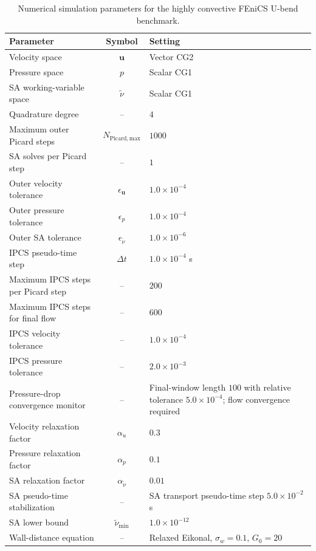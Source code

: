 \begin{table}[htbp]
	\centering
	\footnotesize
	\caption{Numerical simulation parameters for the highly convective FEniCS U-bend benchmark.}
	\label{tab:app_A_ubend_numerical}
	\renewcommand{\arraystretch}{1.2}
	\begin{tabularx}{\textwidth}{l c X}
		\hline
		\textbf{Parameter} & \textbf{Symbol} & \textbf{Setting} \\
		\hline
		Velocity space & $\mathbf{u}$ & Vector CG2 \\
		Pressure space & $p$ & Scalar CG1 \\
		SA working-variable space & $\tilde{\nu}$ & Scalar CG1 \\
		Quadrature degree & -- & $4$ \\
			Maximum outer Picard steps & $N_{\mathrm{Picard,max}}$ & $1000$ \\
		SA solves per Picard step & -- & $1$ \\
		Outer velocity tolerance & $\epsilon_{\mathbf{u}}$ & $1.0 \times 10^{-4}$ \\
		Outer pressure tolerance & $\epsilon_p$ & $1.0 \times 10^{-4}$ \\
		Outer SA tolerance & $\epsilon_{\tilde{\nu}}$ & $1.0 \times 10^{-6}$ \\
			IPCS pseudo-time step & $\Delta t$ & $1.0 \times 10^{-4}$ s \\
				Maximum IPCS steps per Picard step & -- & $200$ \\
			Maximum IPCS steps for final flow & -- & $600$ \\
			IPCS velocity tolerance & -- & $1.0 \times 10^{-4}$ \\
			IPCS pressure tolerance & -- & $2.0 \times 10^{-3}$ \\
			Pressure-drop convergence monitor & -- & Final-window length $100$ with relative tolerance $5.0\times10^{-4}$; flow convergence required \\
			Velocity relaxation factor & $\alpha_u$ & $0.3$ \\
			Pressure relaxation factor & $\alpha_p$ & $0.1$ \\
			SA relaxation factor & $\alpha_{\tilde{\nu}}$ & $0.01$ \\
			SA pseudo-time stabilization & -- & SA transport pseudo-time step $5.0\times10^{-2}$ s \\
			SA lower bound & $\tilde{\nu}_{\min}$ & $1.0 \times 10^{-12}$ \\
			Wall-distance equation & -- & Relaxed Eikonal, $\sigma_w=0.1$, $G_0=20$ \\

\end{tabularx}
\end{table}
